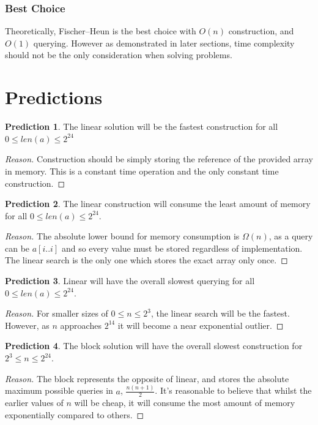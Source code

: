 \documentclass{article}
\theoremstyle{definition}
\newtheorem{prediction}{Prediction}
\begin{document}
\subsubsection{Best Choice}
Theoretically, Fischer--Heun is the best choice with $O(n)$ construction, and $O(1)$ querying.  However as demonstrated in later sections, time complexity should not be the only consideration when solving problems.

\section{Predictions}

\begin{prediction}\label{pred:worst}
The linear solution will be the fastest construction for all $0 \le len(a) \le 2^{24}$
\end{prediction}
\begin{proof}[Reason]
Construction should be simply storing the reference of the provided array in memory.  This is a constant time operation and the only constant time construction.
\end{proof}


\begin{prediction}\label{pred:avg}
The linear construction will consume the least amount of memory for all $0 \le len(a) \le 2^{24}$.
\end{prediction}
\begin{proof}[Reason]
The absolute lower bound for memory consumption is $\Omega(n)$, as a query can be $a[i..i]$ and so every value must be stored regardless of implementation.  The linear search is the only one which stores the exact array only once.
\end{proof}

\begin{prediction}\label{pred:best}
Linear will have the overall slowest querying for all $0 \le len(a) \le 2^{24}$.
\end{prediction}
\begin{proof}[Reason]
For smaller sizes of $0 \le n \le 2^3$, the linear search will be the fastest.  However, as $n$ approaches $2^{14}$ it will become a near exponential outlier.
\end{proof}

\begin{prediction}\label{pred:best}
The block solution will have the overall slowest construction for $2^3 \le n \le 2^{24}$.
\end{prediction}
\begin{proof}[Reason]
The block represents the opposite of linear, and stores the absolute maximum possible queries in $a$, $\frac{n(n+1)}{2}$.  It's reasonable to believe that whilst the earlier values of $n$ will be cheap, it will consume the most amount of memory exponentially compared to others.
\end{proof}
\end{document}
